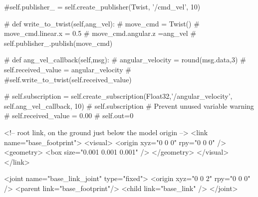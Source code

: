 #self.publisher_ = self.create_publisher(Twist, '/cmd_vel', 10)

# def write_to_twist(self,ang_vel):
#     move_cmd = Twist()
#     move_cmd.linear.x = 0.5
#     move_cmd.angular.z =ang_vel
#     self.publisher_.publish(move_cmd)

# def ang_vel_callback(self,msg):
#     angular_velocity = round(msg.data,3)
#     self.received_value = angular_velocity
#     #self.write_to_twist(self.received_value)
    
# self.subscription = self.create_subscription(Float32,'/angular_velocity', self.ang_vel_callback, 10)
# self.subscription  # Prevent unused variable warning
# self.received_value = 0.00
# self.out=0 





<!-- root link, on the ground just below the model origin -->
<link name="base_footprint">
 <visual>
    <origin xyz="0 0 0" rpy="0 0 0" />
    <geometry>
      <box size="0.001 0.001 0.001" />
    </geometry>
  </visual>
</link>

<joint name="base_link_joint" type="fixed">
  <origin xyz="0 0 2" rpy="0 0 0" />
  <parent link="base_footprint"/>
  <child link="base_link" />
</joint>